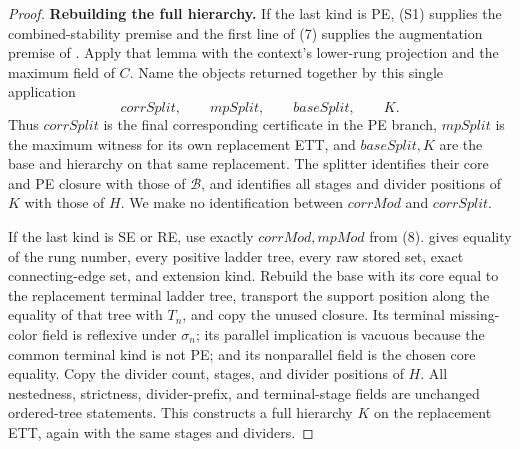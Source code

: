\begin{proof}
\textbf{Rebuilding the full hierarchy.}
If the last kind is PE, (S1) supplies the combined-stability premise and
the first line of (7) supplies the augmentation premise of
.  Apply that lemma with the context's
lower-rung projection and the maximum field of \(C\).  Name the objects
returned together by this single application
\[
 \mathit{corrSplit},\qquad \mathit{mpSplit},\qquad
 \mathit{baseSplit},\qquad K.                                    \tag{8a}
\]
Thus \(\mathit{corrSplit}\) is the final corresponding certificate in
the PE branch, \(\mathit{mpSplit}\) is the maximum witness for its own
replacement ETT, and \(\mathit{baseSplit},K\) are the base and hierarchy
on that same replacement.  The splitter identifies their core and PE
closure with those of \(\mathcal B\), and identifies all stages and
divider positions of \(K\) with those of \(H\).  We make no identification
between \(\mathit{corrMod}\) and \(\mathit{corrSplit}\).

If the last kind is SE or RE, use exactly
\(\mathit{corrMod},\mathit{mpMod}\) from (8).
 gives equality of the rung
number, every positive ladder tree, every raw stored set, exact
connecting-edge set, and extension kind.  Rebuild the base with its core
equal to the replacement terminal ladder tree, transport the support
position along the equality of that tree with \(T_n\), and copy the unused
closure.  Its terminal missing-color field is reflexive under
\(\sigma_n\); its parallel implication is vacuous because the common
terminal kind is not PE; and its nonparallel field is the chosen core
equality.  Copy the divider count, stages, and divider positions of \(H\).
All nestedness, strictness, divider-prefix, and terminal-stage fields are
unchanged ordered-tree statements.  This constructs a full hierarchy
\(K\) on the replacement ETT, again with the same stages and dividers.


\end{proof}
